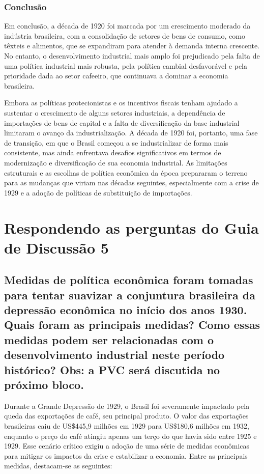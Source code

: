 \documentclass[a4paper,12pt]{article}[abntex2]
\begin{document}
\subsubsection{Conclusão}

Em conclusão, a década de 1920 foi marcada por um crescimento moderado da indústria brasileira, com a consolidação de setores de bens de consumo, como têxteis e alimentos, que se expandiram para atender à demanda interna crescente. No entanto, o desenvolvimento industrial mais amplo foi prejudicado pela falta de uma política industrial mais robusta, pela política cambial desfavorável e pela prioridade dada ao setor cafeeiro, que continuava a dominar a economia brasileira.

Embora as políticas protecionistas e os incentivos fiscais tenham ajudado a sustentar o crescimento de alguns setores industriais, a dependência de importações de bens de capital e a falta de diversificação da base industrial limitaram o avanço da industrialização. A década de 1920 foi, portanto, uma fase de transição, em que o Brasil começou a se industrializar de forma mais consistente, mas ainda enfrentava desafios significativos em termos de modernização e diversificação de sua economia industrial. As limitações estruturais e as escolhas de política econômica da época prepararam o terreno para as mudanças que viriam nas décadas seguintes, especialmente com a crise de 1929 e a adoção de políticas de substituição de importações.

\newpage
\section{\textbf{Respondendo as perguntas do Guia de Discussão 5}}

\subsection{\textbf{Medidas de política econômica foram tomadas para tentar suavizar a conjuntura brasileira da depressão econômica no início dos anos 1930. Quais foram as principais medidas? Como essas medidas podem ser relacionadas com o desenvolvimento industrial neste período histórico? Obs: a PVC será discutida no próximo bloco.}}

Durante a Grande Depressão de 1929, o Brasil foi severamente impactado pela queda das exportações de café, seu principal produto. O valor das exportações brasileiras caiu de US\$445,9 milhões em 1929 para US\$180,6 milhões em 1932, enquanto o preço do café atingiu apenas um terço do que havia sido entre 1925 e 1929. Esse cenário crítico exigiu a adoção de uma série de medidas econômicas para mitigar os impactos da crise e estabilizar a economia. Entre as principais medidas, destacam-se as seguintes:
\end{document}
